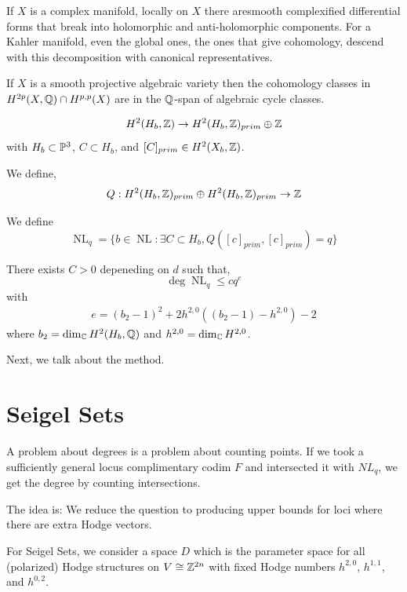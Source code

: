 \documentclass[12pt]{amsart}
\begin{document}
If $X$ is a complex manifold, locally on $X$ there aresmooth complexified differential forms that break into holomorphic and anti-holomorphic components. For a Kahler manifold, even the global ones, the ones that give cohomology, descend with this decomposition with canonical representatives.

\begin{conjecture}
    If $X$ is a smooth projective algebraic variety then the cohomology classes in $H^{2p}(X, \Q) \cap H^{p, p}(X)$ are in the $\Q$-span of algebraic cycle classes.
\end{conjecture}

\begin{align*}
    H^2(H_b, \Z) \to H^2(H_b, \Z)_{prim} \oplus \Z
\end{align*}
with $H_b \subset \P^3$, $C \subset H_b$, and $[C]_{prim} \in H^2(X_b, \Z)$. 

We define,
\[ Q : H^2(H_b, \Z)_{prim} \oplus H^2(H_b, \Z)_{prim} \to \Z\]     

\begin{definition}
    We define
    \[ \operatorname{NL}_q = \{ b \in \operatorname{NL} : \exists C \subset H_b, Q([c]_{prim}, [c]_{prim}) = q\} \]
\end{definition}


\begin{theorem}[Urbanik.]
    There exists $C > 0$ depeneding on $d$ such that, 
    \[ \deg \operatorname{NL}_q \leq c q^e\]
    with 
    \begin{align*}
        e = (b_2-1)^2 + 2h^{2,0}((b_2-1) - h^{2,0}) - 2
    \end{align*}
    where $b_2 = \dim_\C H^2(H_b, \Q)$ and $h^{2,0} = \dim_\C H^{2,0}$.
\end{theorem}

Next, we talk about the method. 

\section{Seigel Sets}
A problem about degrees is a problem about counting points. If we took a sufficiently general locus complimentary codim $F$ and intersected it with $NL_q$, we get the degree by counting intersections. 

The idea is: We reduce the question to producing upper bounds for loci where there are extra Hodge vectors. 

For Seigel Sets, we consider a space $D$ which is the parameter space for all (polarized) Hodge structures on $V \cong \Z^{2n}$ with fixed Hodge numbers $h^{2,0}$, $h^{1,1}$, and $h^{0,2}$. 
\end{document}
